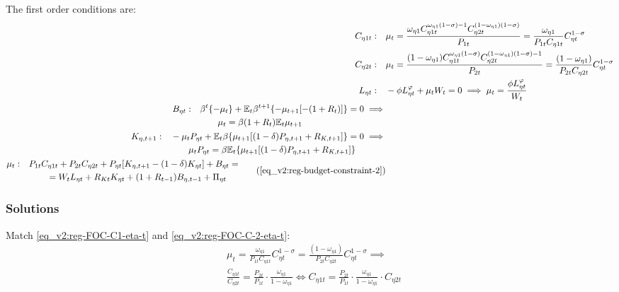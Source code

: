 \documentclass[../thesis.tex]{subfiles}
\begin{document}
The first order conditions are:
\begin{align}
	C_{\eta 1 t}: \quad & \mu_t = \frac{\omega_{\eta 1} C_{\eta 1 t}^{\omega_{\eta 1} (1 -\sigma) -1} C_{\eta 2 t}^{(1 -\omega_{\eta 1})(1 -\sigma)}}{P_{1 t}} = \frac{\omega_{\eta 1}}{P_{1 t} C_{\eta 1 t}} C_{\eta t}^{1 -\sigma} \label{eq_v2:reg-FOC-C1-eta-t} 
	\\
	C_{\eta 2 t}: \quad & \mu_t = \frac{(1 -\omega_{\eta 1}) C_{\eta 1 t}^{\omega_{\eta 1} (1 -\sigma)} C_{\eta 2 t}^{(1 -\omega_{\eta 1})(1 -\sigma)-1}}{P_{2 t}} = \frac{(1 -\omega_{\eta 1})}{P_{2 t} C_{\eta 2 t}} C_{\eta t}^{1 -\sigma} \label{eq_v2:reg-FOC-C-2-eta-t} 
	\\
	L_{\eta t}: \quad & -\phi L_{\eta t}^{\varphi} +\mu_t W_t = 0 \implies \mu_t = \frac{\phi L_{\eta t}^{\varphi}}{W_t} \label{eq_v2:reg-household-FOC-Lt} 
	\\
	\begin{split}
		B_{\eta t}: \quad & \beta^t \{-\mu_t\} + \E \beta^{t+1} \{ -\mu_{t+1} [-(1 + R_{t})] \} = 0 \implies \\ & \qquad \mu_t = \beta (1 + R_{t}) \E{ \mu_{t+1}}
	\end{split} \label{eq_v2:reg-FOC-Bt}
	\\
	\begin{split}
		K_{\eta, t+1}: \quad & -\mu_t P_{\eta t} + \mathbb{E}_t \beta \{ \mu_{t+1} [(1-\delta) P_{\eta, t+1} + R_{K,t+1}] \} = 0 \implies \\ & \qquad \mu_t P_{\eta t} = \beta \mathbb{E}_t \{ \mu_{t+1} [(1-\delta) P_{\eta, t+1} + R_{K,t+1}] \}
	\end{split} \label{eq_v2:reg-household-FOC-Kt} \\
	\begin{split}
		\mu_t: \quad & P_{1 t} C_{\eta 1 t} + P_{2 t} C_{\eta 2 t} + P_{\eta t} [ K_{\eta, t+1} - (1-\delta)K_{\eta t} ] + B_{\eta t} = \\ & \qquad = W_t L_{\eta t} + R_{Kt} K_{\eta t} + (1 + R_{t-1}) B_{\eta,t-1} + \Pi_{\eta t}
	\end{split} \tag{\ref{eq_v2:reg-budget-constraint-2}}
\end{align}

\subsubsection*{Solutions}

Match \ref{eq_v2:reg-FOC-C1-eta-t} and \ref{eq_v2:reg-FOC-C-2-eta-t}:
\begin{align}
	& \mu_t = \frac{\omega_{\eta 1}}{P_{1 t} C_{\eta 1 t}} C_{\eta t}^{1 -\sigma} = \frac{(1 -\omega_{\eta 1})}{P_{2 t} C_{\eta 2 t}} C_{\eta t}^{1 -\sigma} \implies \nonumber \\
	& \frac{C_{\eta 1 t}}{C_{\eta 2 t}} = \frac{P_{2 t}}{P_{1 t}} \cdot \frac{\omega_{\eta 1}}{1 -\omega_{\eta 1}} \iff C_{\eta 1 t} = \frac{P_{2 t}}{P_{1 t}} \cdot \frac{\omega_{\eta 1}}{1 -\omega_{\eta 1}} \cdot C_{\eta 2 t} \label{eq_v2:reg-FOC-C1-C2}
\end{align}
\end{document}
